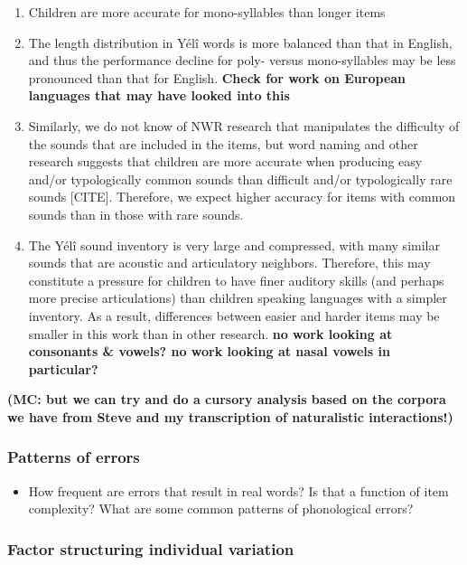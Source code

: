 \documentclass[english,,man]{apa6}
\providecommand{\tightlist}{%
  \setlength{\itemsep}{0pt}\setlength{\parskip}{0pt}}
\begin{document}
\begin{enumerate}
\def\labelenumi{\arabic{enumi}.}
\item
  Children are more accurate for mono-syllables than longer items
\item
  The length distribution in Yélî words is more balanced than that in English, and thus the performance decline for poly- versus mono-syllables may be less pronounced than that for English. \textbf{Check for work on European languages that may have looked into this}
\item
  Similarly, we do not know of NWR research that manipulates the difficulty of the sounds that are included in the items, but word naming and other research suggests that children are more accurate when producing easy and/or typologically common sounds than difficult and/or typologically rare sounds {[}CITE{]}. Therefore, we expect higher accuracy for items with common sounds than in those with rare sounds.
\item
  The Yélî sound inventory is very large and compressed, with many similar sounds that are acoustic and articulatory neighbors. Therefore, this may constitute a pressure for children to have finer auditory skills (and perhaps more precise articulations) than children speaking languages with a simpler inventory. As a result, differences between easier and harder items may be smaller in this work than in other research. \textbf{no work looking at consonants \& vowels? no work looking at nasal vowels in particular?}
\end{enumerate}

\textbf{(MC: but we can try and do a cursory analysis based on the corpora we have from Steve and my transcription of naturalistic interactions!)}

\hypertarget{patterns-of-errors}{%
\subsubsection{Patterns of errors}\label{patterns-of-errors}}

\begin{itemize}
\tightlist
\item
  How frequent are errors that result in real words? Is that a function of item complexity? What are some common patterns of phonological errors?
\end{itemize}

\hypertarget{factor-structuring-individual-variation}{%
\subsubsection{Factor structuring individual variation}\label{factor-structuring-individual-variation}}
\end{document}
